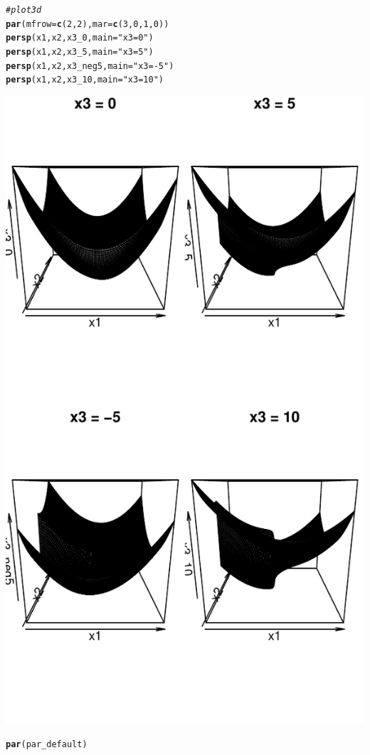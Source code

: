 \documentclass{article}\usepackage[]{graphicx}\usepackage[]{color}
\makeatletter
\def\maxwidth{ %
  \ifdim\Gin@nat@width>\linewidth
    \linewidth
  \else
    \Gin@nat@width
  \fi
}
\newcommand{\hlnum}[1]{\textcolor[rgb]{0.686,0.059,0.569}{#1}}%
\newcommand{\hlstr}[1]{\textcolor[rgb]{0.192,0.494,0.8}{#1}}%
\newcommand{\hlcom}[1]{\textcolor[rgb]{0.678,0.584,0.686}{\textit{#1}}}%
\newcommand{\hlstd}[1]{\textcolor[rgb]{0.345,0.345,0.345}{#1}}%
\newcommand{\hlkwc}[1]{\textcolor[rgb]{0.333,0.667,0.333}{#1}}%
\newcommand{\hlkwd}[1]{\textcolor[rgb]{0.737,0.353,0.396}{\textbf{#1}}}%
\newenvironment{kframe}{%
 \def\at@end@of@kframe{}%
 \ifinner\ifhmode%
  \def\at@end@of@kframe{\end{minipage}}%
  \begin{minipage}{\columnwidth}%
 \fi\fi%
 \def\FrameCommand##1{\hskip\@totalleftmargin \hskip-\fboxsep
 \colorbox{shadecolor}{##1}\hskip-\fboxsep
     \hskip-\linewidth \hskip-\@totalleftmargin \hskip\columnwidth}%
 \MakeFramed {\advance\hsize-\width
   \@totalleftmargin\z@ \linewidth\hsize
   \@setminipage}}%
 {\par\unskip\endMakeFramed%
 \at@end@of@kframe}
\newenvironment{knitrout}{}{} %
\makeatother
\begin{document}
\begin{knitrout}
\begin{kframe}
\begin{alltt}
\hlcom{#plot 3d}
\hlkwd{par}\hlstd{(}\hlkwc{mfrow}\hlstd{=}\hlkwd{c}\hlstd{(}\hlnum{2}\hlstd{,} \hlnum{2}\hlstd{),} \hlkwc{mar} \hlstd{=} \hlkwd{c}\hlstd{(}\hlnum{3}\hlstd{,} \hlnum{0}\hlstd{,} \hlnum{1}\hlstd{,} \hlnum{0}\hlstd{))}
\hlkwd{persp}\hlstd{(x1, x2, x3_0,}\hlkwc{main} \hlstd{=} \hlstr{"x3 = 0"}\hlstd{)}
\hlkwd{persp}\hlstd{(x1, x2, x3_5,} \hlkwc{main} \hlstd{=} \hlstr{"x3 = 5"}\hlstd{)}
\hlkwd{persp}\hlstd{(x1, x2, x3_neg5,} \hlkwc{main} \hlstd{=} \hlstr{"x3 = -5"}\hlstd{)}
\hlkwd{persp}\hlstd{(x1, x2, x3_10,} \hlkwc{main} \hlstd{=} \hlstr{"x3 = 10"}\hlstd{)}
\end{alltt}
\end{kframe}
\includegraphics[width=\maxwidth]{figure/unnamed-chunk-4-2} 
\begin{kframe}\begin{alltt}
\hlkwd{par}\hlstd{(par_default)}


\end{alltt}
\end{kframe}
\end{knitrout}
\end{document}
